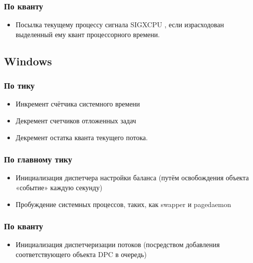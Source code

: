 \subsubsection{По кванту}

\begin{itemize}
    \item Посылка текущему процессу сигнала { \ttfamily SIGXCPU }, если
        израсходован выделенный ему квант процессорного времени.
\end{itemize}

\subsection{Windows}

\subsubsection{По тику}

\begin{itemize}
    \item Инкремент счётчика системного времени
    \item Декремент счетчиков отложенных задач
    \item Декремент остатка кванта текущего потока.
\end{itemize}

\subsubsection{По главному тику}

\begin{itemize}
    \item Инициализация диспетчера настройки баланса
        (путём освобождения объекта «событие» каждую секунду)
    \item Пробуждение системных процессов, таких,
        как { \ttfamily swapper } и { \ttfamily pagedaemon }
\end{itemize}

\subsubsection{По кванту}

\begin{itemize}
    \item Инициализация диспетчеризации потоков (посредством добавления соответствующего объекта DPC в очередь)
\end{itemize}
